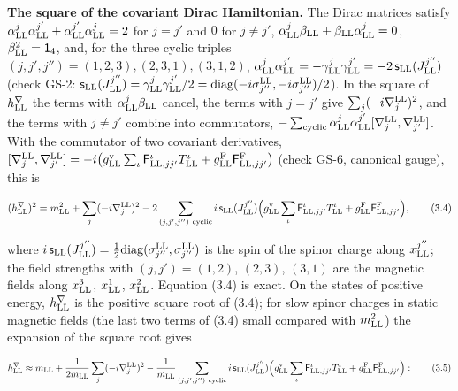 \documentclass[
  10pt,
]{article}
\begin{document}
\textbf{The square of the covariant Dirac Hamiltonian.} The Dirac
matrices satisfy
\(\alpha^j_{\rm LL}\alpha^{j'}_{\rm LL}+\alpha^{j'}_{\rm LL}\alpha^j_{\rm LL}=2\)
for \(j=j'\) and \(0\) for \(j\ne j'\),
\(\alpha^j_{\rm LL}\beta_{\rm LL}+\beta_{\rm LL}\alpha^j_{\rm LL}=0\),
\(\beta_{\rm LL}^2=\mathsf 1_4\), and, for the three cyclic triples
\((j,j',j'')=(1,2,3),(2,3,1),(3,1,2)\),
\(\alpha^j_{\rm LL}\alpha^{j'}_{\rm LL}=-\gamma^j_{\rm LL}\gamma^{j'}_{\rm LL}=-2\,\mathsf s_{\rm LL}(J^{j''}_{\rm LL})\)
(check GS-2:
\(\mathsf s_{\rm LL}(J^{j''}_{\rm LL})=\gamma^j_{\rm LL}\gamma^{j'}_{\rm LL}/2=\mathrm{diag}(-i\sigma^{\rm LL}_{j''},-i\sigma^{\rm LL}_{j''})/2\)).
In the square of \(h^\nabla_{\rm LL}\) the terms with
\(\alpha^j_{\rm LL}\beta_{\rm LL}\) cancel, the terms with \(j=j'\) give
\(\sum_j(-i\nabla^{\rm LL}_j)^2\), and the terms with \(j\ne j'\)
combine into commutators,
\(-\sum_{\rm cyclic}\alpha^j_{\rm LL}\alpha^{j'}_{\rm LL}[\nabla^{\rm LL}_j,\nabla^{\rm LL}_{j'}]\).
With the commutator of two covariant derivatives,
\([\nabla^{\rm LL}_j,\nabla^{\rm LL}_{j'}]=-i\big(g^{\rm v}_{\rm LL}\sum_\iota\mathsf F^\iota_{{\rm LL},jj'}T^\iota_{\rm LL}+g^{\rm F}_{\rm LL}\mathsf F^{\rm F}_{{\rm LL},jj'}\big)\)
(check GS-6, canonical gauge), this is

\[(h^\nabla_{\rm LL})^2=m_{\rm LL}^2+\sum_j(-i\nabla^{\rm LL}_j)^2-2\sum_{(j,j',j'')\ \text{cyclic}}i\,\mathsf s_{\rm LL}(J^{j''}_{\rm LL})\Big(g^{\rm v}_{\rm LL}\sum_\iota\mathsf F^\iota_{{\rm LL},jj'}T^\iota_{\rm LL}+g^{\rm F}_{\rm LL}\mathsf F^{\rm F}_{{\rm LL},jj'}\Big),\tag{3.4}\]

where
\(i\,\mathsf s_{\rm LL}(J^{j''}_{\rm LL})=\tfrac12\mathrm{diag}(\sigma^{\rm LL}_{j''},\sigma^{\rm LL}_{j''})\)
is the spin of the spinor charge along \(x^{j''}_{\rm LL}\); the field
strengths with \((j,j')=(1,2)\), \((2,3)\), \((3,1)\) are the magnetic
fields along \(x^3_{\rm LL}\), \(x^1_{\rm LL}\), \(x^2_{\rm LL}\).
Equation (3.4) is exact. On the states of positive energy,
\(h^\nabla_{\rm LL}\) is the positive square root of (3.4); for slow
spinor charges in static magnetic fields (the last two terms of (3.4)
small compared with \(m_{\rm LL}^2\)) the expansion of the square root
gives

\[h^\nabla_{\rm LL}\approx m_{\rm LL}+\frac1{2m_{\rm LL}}\sum_j(-i\nabla^{\rm LL}_j)^2-\frac1{m_{\rm LL}}\sum_{(j,j',j'')\ \text{cyclic}}i\,\mathsf s_{\rm LL}(J^{j''}_{\rm LL})\Big(g^{\rm v}_{\rm LL}\sum_\iota\mathsf F^\iota_{{\rm LL},jj'}T^\iota_{\rm LL}+g^{\rm F}_{\rm LL}\mathsf F^{\rm F}_{{\rm LL},jj'}\Big):\tag{3.5}\]
\end{document}
